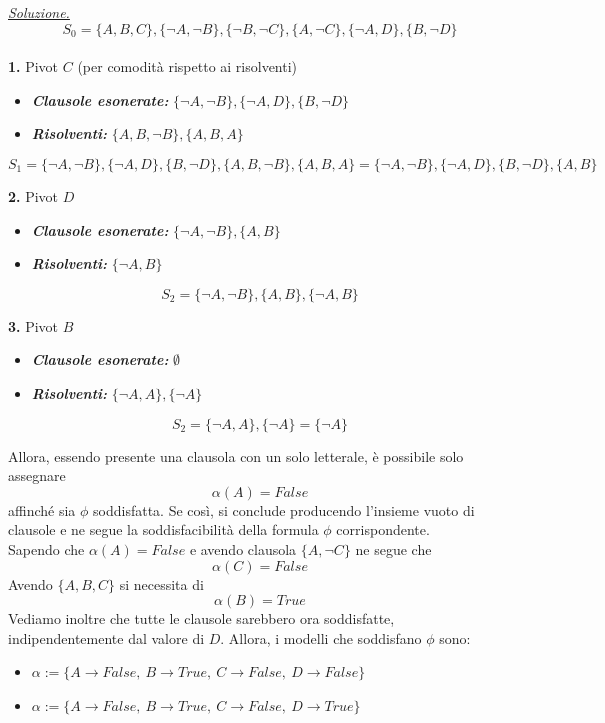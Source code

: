 \documentclass[a4paper,10pt]{article}
\begin{document}
{\begin{itemize}[label=, leftmargin=0pt]
    \begin{osservazioni}
    \underline{\textit{Soluzione.}}\\
    $$S_0 = \{A, B, C\}, \{\lnot A, \lnot B\}, \{\lnot B, \lnot C\}, \{A, \lnot C\}, \{\lnot A, D\}, \{B, \lnot D\}$$\\
    
    \textbf{1.} Pivot $C$ (per comodità rispetto ai risolventi)
    \begin{itemize}
        \item \textbf{\textit{Clausole esonerate:}} $\{\lnot A, \lnot B\}, \{\lnot A, D\}, \{B, \lnot D\}$
        \item \textbf{\textit{Risolventi:}} $\{A, B, \lnot B\}, \{A, B, A\}$
    \end{itemize}
    $$S_1 = \{\lnot A, \lnot B\}, \{\lnot A, D\}, \{B, \lnot D\},\{A, B, \lnot B\}, \{A, B, A\}=\{\lnot A, \lnot B\}, \{\lnot A, D\}, \{B, \lnot D\}, \{A, B\}$$

    \textbf{2.} Pivot $D$
    \begin{itemize}
        \item \textbf{\textit{Clausole esonerate:}} $\{\lnot A, \lnot B\}, \{A, B\}$
        \item \textbf{\textit{Risolventi:}} $ \{\lnot A, B\}$
    \end{itemize}
    $$S_2 = \{\lnot A, \lnot B\}, \{A, B\},\{\lnot A, B\}$$

    \textbf{3.} Pivot $B$
    \begin{itemize}
        \item \textbf{\textit{Clausole esonerate:}} $\emptyset$
        \item \textbf{\textit{Risolventi:}} $\{\lnot A, A\}, \{\lnot A\}$
    \end{itemize}
    $$S_2 = \{\lnot A, A\}, \{\lnot A\} =\{\lnot A\}$$
    
    Allora, essendo presente una clausola con un solo letterale, è possibile solo assegnare $$\alpha(A)=False$$ affinché sia $\phi$ soddisfatta. Se così, si conclude producendo l'insieme vuoto di clausole e ne segue la soddisfacibilità della formula $\phi$ corrispondente. \\
    Sapendo che $\alpha(A)=False$ e avendo clausola $\{A, \lnot C\}$ ne segue che $$\alpha(C)=False$$Avendo $\{A, B, C\}$ si necessita di $$\alpha(B)=True$$Vediamo inoltre che tutte le clausole sarebbero ora soddisfatte, indipendentemente dal valore di $D$. Allora, i modelli che soddisfano $\phi$ sono:
    \begin{itemize}
        \item $\alpha := \{A\rightarrow False,\ B\rightarrow True,\ C\rightarrow False,\ D\rightarrow False\} $
        \item $\alpha := \{A\rightarrow False,\ B\rightarrow True,\ C\rightarrow False,\ D\rightarrow True\} $
    \end{itemize}
    


\end{osservazioni}
\end{itemize}}
\end{document}
